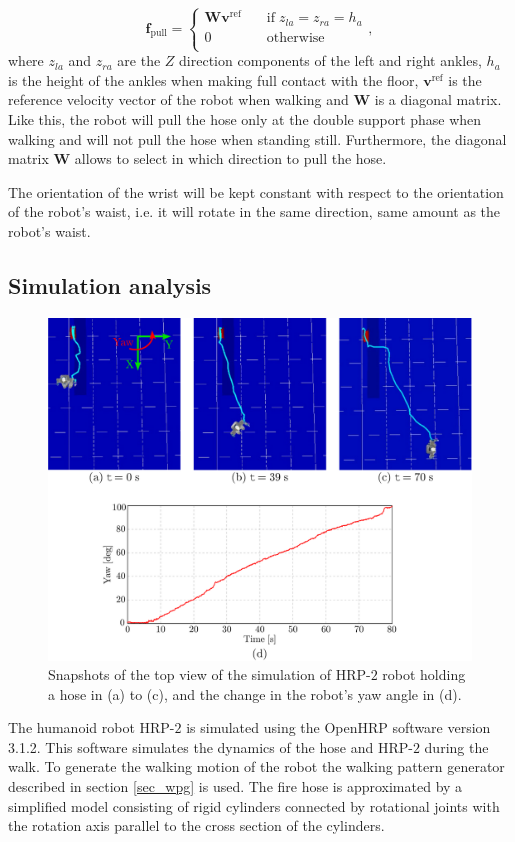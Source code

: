 %
%
\begin{equation}
\mathbf{f}_{\mathrm{pull}} = \begin{cases}
\mathbf{W} \mathbf{v}^{\mathrm{ref}}	& \quad \mathrm{if} \; z_{la} = z_{ra} = h_a  \\
0  & \quad \mathrm{otherwise} \\
\end{cases}
, 
\label{fpull}
\end{equation}
%
where $z_{la}$ and $z_{ra}$ are the $Z$ direction components of the left and right ankles, $h_a$ is the height of the ankles when making full contact with the floor, $\mathbf{v}^{\text{ref}}$ is the reference velocity vector of the robot when walking and $\mathbf{W}$ is a diagonal matrix.
%
Like this, the robot will pull the hose only at the double support phase when walking and will not pull the hose when standing still.
%
Furthermore, the diagonal matrix $\mathbf{W}$ allows to select in which direction to pull the hose.


The orientation of the wrist will be kept constant with respect to the orientation of the robot's waist, i.e. it will rotate in the same direction, same amount as the robot's waist.


\subsection{Simulation analysis}			\label{sim_pulling}
%
%
\begin{figure}[ht]
 \centering
 \includegraphics[height=0.40\textwidth]{./figures/yaw_drift_simGraph.pdf}
 \vspace{-3mm}
 \caption{Snapshots of the top view of the simulation of HRP-$2$ robot holding a hose in (a) to (c), and the change in the robot's yaw angle in (d).}
 \label{drift_sim}
\end{figure}
%
%
The humanoid robot HRP-$2$ is simulated using the OpenHRP software version 3.1.2.
This software simulates the dynamics of the hose and HRP-$2$ during the walk.
%
To generate the walking motion of the robot the walking pattern generator described in section \ref{sec_wpg} is used.
%
The fire hose is approximated by a simplified model consisting of rigid cylinders connected by rotational joints with the rotation axis parallel to the cross section of the cylinders.
%

